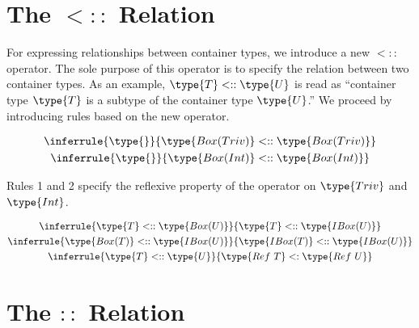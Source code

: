 \documentclass{article}
\newcommand\ltypeof{\mathrel{::}}
\newcommand\subtype{\mathrel{<:}}
\newcommand\subtypecont{\mathrel{<::}}
\begin{document}
\section*{The $\subtypecont$ Relation}

For expressing relationships between container types, we introduce a new
$\subtypecont$ operator. The sole purpose of this operator is to specify the
relation between two container types. As an example, $\type{T} \subtypecont
\type{U}$ is read as ``container type $\type{T}$ is a subtype of the container
type $\type{U}$.'' We proceed by introducing rules based on the new operator.

\begin{gather}
  \inferrule{\type{}}{\type{Box(Triv)} \subtypecont \type{Box(Triv)}}\\
  \inferrule{\type{}}{\type{Box(Int)} \subtypecont \type{Box(Int)}}
\end{gather}

Rules 1 and 2 specify the reflexive property of the operator on $\type{Triv}$
and $\type{Int}$.

\begin{gather}
  \inferrule{\type{T} \subtypecont \type{Box(U)}}{\type{T} \subtypecont \type{IBox(U)}}\\
  \inferrule{\type{Box(T)} \subtypecont \type{IBox(U)}}{\type{IBox(T)} \subtypecont \type{IBox(U)}}\\
  \inferrule{\type{T} \subtypecont \type{U}}{\type{Ref\ T} \subtype \type{Ref\ U}}
\end{gather}

\medskip



\section*{The $\ltypeof$ Relation}
\end{document}

